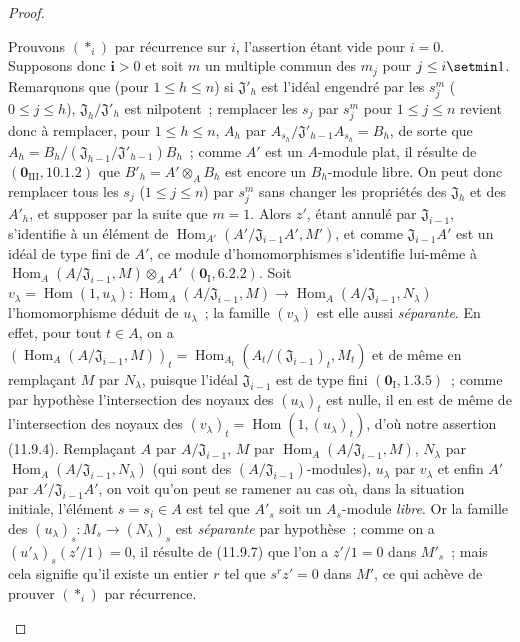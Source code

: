 \begin{proof}
\begin{enumerate}[label=(\roman*)]
  Prouvons $(*_i)$ par récurrence sur $i$, l'assertion étant vide pour $i=0$.
  Supposons donc $\boldsymbol{i}>0$ et soit $m$ un multiple commun des $m_j$ pour
  $j\leq i\setmin 1$. Remarquons que (pour $1\leq h\leq n$) si
  $\mathfrak J'_h$ est l'idéal engendré par les $s_j^m$ ($0\leq j\leq h$),
  $\mathfrak J_h/\mathfrak J'_h$ est nilpotent~; remplacer les $s_j$ par
  $s_j^m$ pour $1\leq j\leq n$ revient donc à remplacer, pour
  $1\leq h\leq n$, $A_h$ par
  $A_{s_h}/\mathfrak J'_{h-1}A_{s_h}=B_h$, de sorte que
  $A_h=B_h/(\mathfrak J_{h-1}/\mathfrak J'_{h-1})B_h$~; comme $A'$ est un
  $A$-module plat, il résulte de $(\mathbf 0_{\mathrm{III}},10.1.2)$ que
  $B'_h=A'\otimes_A B_h$ est encore un $B_h$-module libre. On peut donc
  remplacer tous les $s_j$ ($1\leq j\leq n$) par $s_j^m$ sans changer les
  propriétés des $\mathfrak J_h$ et des $A'_h$, et supposer par la suite que
  $m=1$. Alors $z'$, étant annulé par $\mathfrak J_{i-1}$, s'identifie à un
  élément de
  $\operatorname{Hom}_{A'}(A'/\mathfrak J_{i-1}A',M')$, et comme
  $\mathfrak J_{i-1}A'$ est un idéal de type fini de $A'$, ce module
  d'homomorphismes s'identifie lui-même à
  $\operatorname{Hom}_A(A/\mathfrak J_{i-1},M)\otimes_A A'$
  $(\mathbf 0_{\mathrm I},6.2.2)$. Soit
  $v_\lambda=\operatorname{Hom}(1,u_\lambda):
  \operatorname{Hom}_A(A/\mathfrak J_{i-1},M)\longrightarrow
  \operatorname{Hom}_A(A/\mathfrak J_{i-1},N_\lambda)$
  l'homomorphisme déduit de $u_\lambda$~; la famille $(v_\lambda)$ est elle
  aussi \emph{séparante}. En effet, pour tout $t\in A$, on a
  $(\operatorname{Hom}_A(A/\mathfrak J_{i-1},M))_t
  =\operatorname{Hom}_{A_t}(A_t/(\mathfrak J_{i-1})_t,M_t)$
  et de même en remplaçant $M$ par $N_\lambda$, puisque l'idéal
  $\mathfrak J_{i-1}$ est de type fini $(\mathbf 0_{\mathrm I},1.3.5)$~;
  comme par hypothèse l'intersection des noyaux des $(u_\lambda)_t$ est nulle,
  il en est de même de l'intersection des noyaux des
  $(v_\lambda)_t=\operatorname{Hom}(1,(u_\lambda)_t)$, d'où notre assertion
  (11.9.4). Remplaçant $A$ par $A/\mathfrak J_{i-1}$, $M$ par
  $\operatorname{Hom}_A(A/\mathfrak J_{i-1},M)$, $N_\lambda$ par
  $\operatorname{Hom}_A(A/\mathfrak J_{i-1},N_\lambda)$ (qui sont des
  $(A/\mathfrak J_{i-1})$-modules), $u_\lambda$ par $v_\lambda$ et enfin $A'$
  par $A'/\mathfrak J_{i-1}A'$, on voit qu'on peut se ramener au cas où, dans
  la situation initiale, l'élément $s=s_i\in A$ est tel que $A'_s$ soit un
  $A_s$-module \emph{libre}. Or la famille des
  $(u_\lambda)_s:M_s\to(N_\lambda)_s$ est \emph{séparante} par hypothèse~; comme on a
  $(u'_\lambda)_s(z'/1)=0$, il résulte de (11.9.7) que l'on a $z'/1=0$ dans
  $M'_s$~; mais cela signifie qu'il existe un entier $r$ tel que $s^rz'=0$
  dans $M'$, ce qui achève de prouver $(*_i)$ par récurrence.
\end{enumerate}
\end{proof}

